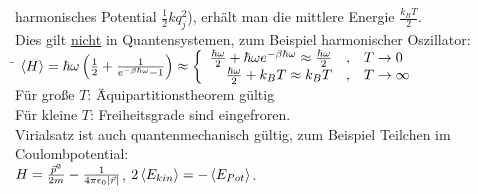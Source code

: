 \begin{tabbing}
harmonisches Potential $\frac12 k q_j^2$), erhält man die mittlere Energie $\frac{k_B T}{2}$.\\
Dies gilt \uline{nicht} in Quantensystemen, zum Beispiel harmonischer Oszillator:\\
\hspace{4em} \= \kill
\>$\angBra{H} = \hbar\omega\norBra{\frac12 + \frac{1}{e^{-\beta \hbar\omega}-1}} \approx \left\{ \begin{array}{r@{\quad , \quad} l}\frac{\hbar\omega}{2} + \hbar\omega e^{-\beta\hbar\omega}\approx \frac{\hbar\omega}{2} & T\to 0\\ \frac{\hbar\omega}{2} + k_B T \approx k_B T & T\to\infty\end{array}\right.$\\
Für große $T$: \=Äquipartitionstheorem gültig\\
Für kleine $T$:\> Freiheitsgrade sind \glqq eingefroren\grqq.\\
Virialsatz ist auch quantenmechanisch gültig, zum Beispiel Teilchen im Coulombpotential:\\
$H = \frac{\vec{p}^2}{2 m} - \frac{1}{4\pi \epsilon_0 \left| \vec{r} \right|}$, $2\left\langle E_{kin} \right\rangle = - \left\langle E_{Pot} \right\rangle$.
\end{tabbing}


